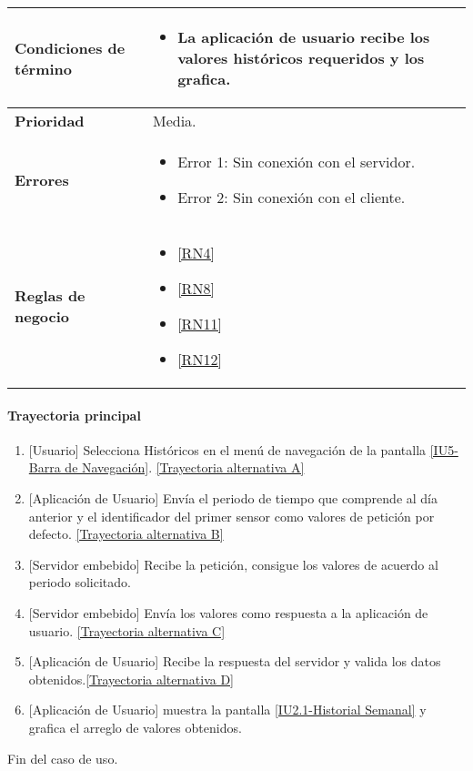 \begin{longtable}{|J{5cm}|J{10.3cm}|}
	\textbf{Condiciones de término} & 
		\begin{itemize}
			\item La aplicación de usuario recibe los valores históricos requeridos y los grafica.
		\end{itemize} \\ \hline 
	\textbf{Prioridad} & 
		Media. \\ \hline
	\textbf{Errores} & 
		\begin{itemize}
		    \item \label{CUU1.3:Error1} Error 1: Sin conexión con el servidor.
		    \item \label{CUU1.3:Error2} Error 2: Sin conexión con el cliente.
		\end{itemize} \\ \hline
	\textbf{Reglas de negocio} & 
		\begin{itemize}
		    \item \ref{RN4}
		    \item \ref{RN8}
			\item \ref{RN11}
			\item \ref{RN12}
		\end{itemize} \\ \hline
\end{longtable}

\paragraph{Trayectoria principal}
    \label{SUB-U-CU1.3:TP}
	\begin{enumerate}
	    \item {[Usuario]} Selecciona Históricos en el menú de navegación de la pantalla \hyperref[fig:Barra de navegacion]{[IU5-Barra de Navegación]}. \hyperref[SUB-U-CU1.3:TA]{[Trayectoria alternativa A]} 
		\item {[Aplicación de Usuario]} Envía el periodo de tiempo que comprende al día anterior y el identificador del primer sensor como valores de petición por defecto. \hyperref[SUB-U-CU1.3:TB]{[Trayectoria alternativa B]} 
		\item {[Servidor embebido]} Recibe la petición, consigue los valores de acuerdo al periodo solicitado. 
		\item {[Servidor embebido]} Envía los valores como respuesta a la aplicación de usuario. \hyperref[SUB-U-CU1.3:TC]{[Trayectoria alternativa C]}
        \item {[Aplicación de Usuario]} Recibe la respuesta del servidor y valida los datos obtenidos.\hyperref[SUB-U-CU1.3:TD]{[Trayectoria alternativa D]}
        \item {[Aplicación de Usuario]} muestra la pantalla \hyperref[fig:Historial Semanal]{[IU2.1-Historial Semanal]} y grafica el arreglo de valores obtenidos. 
	\end{enumerate}
	Fin del caso de uso.

